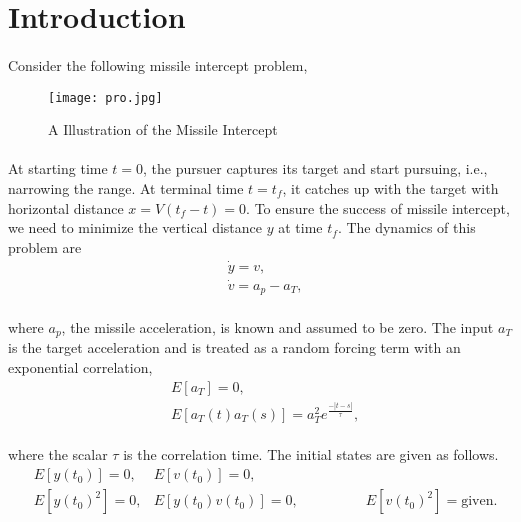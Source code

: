 \section{Introduction}
\paragraph{}
Consider the following missile intercept problem,
\begin{figure}[h]
	\centering
	\texttt{[image: pro.jpg]}
	\caption{A Illustration of the Missile Intercept \cite{js}}
\end{figure}
\vspace{-18pt}
\paragraph{}
At starting time $t = 0$, the pursuer captures its target and start pursuing, i.e., narrowing the range. At terminal time $t = t_f$, it catches up with the target with horizontal distance $x = V(t_f - t) = 0$. To ensure the success of missile intercept, we need to minimize the vertical distance $y$ at time $t_f$. The dynamics of this problem are
\begin{equation}
	\begin{aligned}
		&\dot{y} = v,\\
		&\dot{v} = a_p -a_T,
	\end{aligned}
\end{equation}
\paragraph{}
where $a_p$, the missile acceleration, is known and assumed to be zero. The input $a_T$ is the target acceleration and is treated as a random forcing term with an exponential correlation,
\begin{align*}
&E[a_T] = 0,\\
&E[a_T(t)a_T(s)] = a_T^2e^{\frac{-|t-s|}{\tau}},
\end{align*}
\paragraph{}
where the scalar $\tau$ is the correlation time. The initial states are given as follows.
\begin{align*}
&E[y(t_0)] = 0, &E[v(t_0)] = 0,\\
&E[y(t_0)^2] = 0,  &E[y(t_0)v(t_0)]=0, & \qquad\qquad  E[v(t_0)^2] =\text{given}.
\end{align*}
